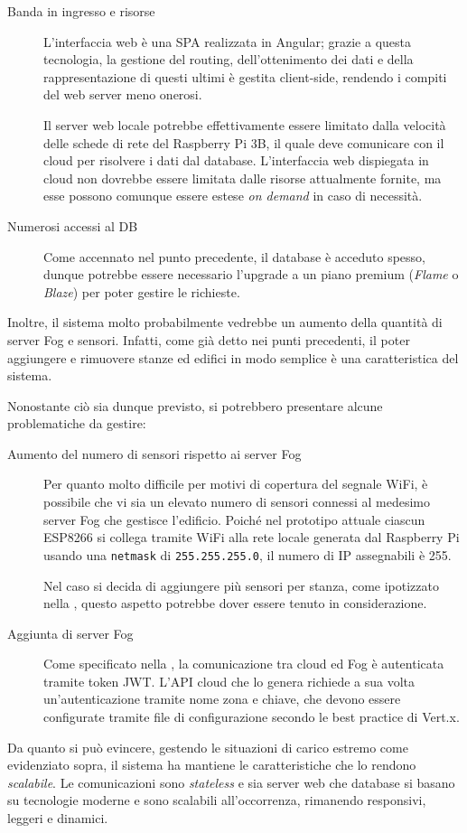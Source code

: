 \begin{description}
  \item[Banda in ingresso e risorse]
    L'interfaccia web è una SPA realizzata in Angular;
    grazie a questa tecnologia, la gestione del routing, dell'ottenimento dei dati e della rappresentazione di questi ultimi è gestita client-side,
    rendendo i compiti del web server meno onerosi.

    Il server web locale potrebbe effettivamente essere limitato dalla velocità delle schede di rete del Raspberry Pi 3B,
    il quale deve comunicare con il cloud per risolvere i dati dal database.
    L'interfaccia web dispiegata in cloud non dovrebbe essere limitata dalle risorse attualmente fornite, ma esse possono comunque essere estese \emph{on demand} in caso di necessità.

  \item[Numerosi accessi al DB]
    Come accennato nel punto precedente, il database è acceduto spesso, dunque potrebbe essere necessario l'upgrade a un piano premium (\emph{Flame} o \emph{Blaze}) per poter gestire le richieste.
\end{description}

Inoltre, il sistema molto probabilmente vedrebbe un aumento della quantità di server Fog e sensori.
Infatti, come già detto nei punti precedenti, il poter aggiungere e rimuovere stanze ed edifici in modo semplice è una caratteristica del sistema.

Nonostante ciò sia dunque previsto, si potrebbero presentare alcune problematiche da gestire:
\begin{description}
  \item[Aumento del numero di sensori rispetto ai server Fog]
    Per quanto molto difficile per motivi di copertura del segnale WiFi, è possibile che vi sia un elevato numero di sensori connessi al medesimo server Fog che gestisce l'edificio.
    Poiché nel prototipo attuale ciascun ESP8266 si collega tramite WiFi alla rete locale generata dal Raspberry Pi usando una \texttt{netmask} di \texttt{255.255.255.0}, il numero di IP assegnabili è 255.

    Nel caso si decida di aggiungere più sensori per stanza, come ipotizzato nella , questo aspetto potrebbe dover essere tenuto in considerazione.
  \item[Aggiunta di server Fog]
    Come specificato nella , la comunicazione tra cloud ed Fog è autenticata tramite token JWT\@.
    L'API cloud che lo genera richiede a sua volta un'autenticazione tramite nome zona e chiave, che devono essere configurate tramite file di configurazione secondo le best practice di Vert.x.
\end{description}

Da quanto si può evincere, gestendo le situazioni di carico estremo come evidenziato sopra, il sistema ha mantiene le caratteristiche che lo rendono \emph{scalabile}.
Le comunicazioni sono \emph{stateless} e sia server web che database si basano su tecnologie moderne e sono scalabili all'occorrenza, rimanendo responsivi, leggeri e dinamici.
